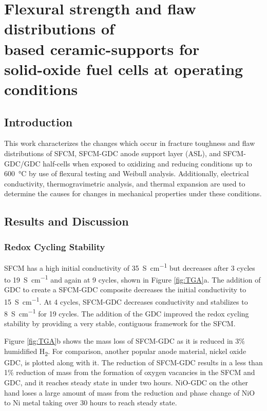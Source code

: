 
\chapter[Flexural strength and flaw distributions of \ce{SrFe_{0.2}Co_{0.4}Mo_{0.4}O_{3}} based ceramic-supports for solid-oxide fuel cells at operating conditions]{Flexural strength and flaw distributions of\\  based ceramic-supports for \\solid-oxide fuel cells at operating conditions}

\section{Introduction}
    This work characterizes the changes which occur in fracture toughness and flaw distributions of SFCM, SFCM-GDC anode support layer (ASL), and SFCM-GDC/GDC half-cells when exposed to oxidizing and reducing conditions up to \SI{600}{\celsius} by use of flexural testing and Weibull analysis.
    Additionally, electrical conductivity, thermogravimetric analysis, and thermal expansion are used to determine the causes for changes in mechanical properties under these conditions.

\section{Results and Discussion}
    \subsection{Redox Cycling Stability}
        SFCM has a high initial conductivity of \SI{35}{S\per\centi\meter} but decreases after 3 cycles to \SI{19}{S\per\centi\meter} and again at 9 cycles, shown in Figure \ref{fig:TGA}a.
        The addition of GDC to create a SFCM-GDC composite decreases the initial conductivity to \SI{15}{S\per\centi\meter}.
        At 4 cycles, SFCM-GDC decreases conductivity and stabilizes to \SI{8}{S\per\centi\meter} for 19 cycles.
        The addition of the GDC improved the redox cycling stability by providing a very stable, contiguous framework for the SFCM.\cite{Mogensen2000,Duncan2006,Bishop2009}

        Figure \ref{fig:TGA}b shows the mass loss of SFCM-GDC as it is reduced in 3\% humidified H\textsubscript{2}.
        For comparison, another popular anode material, nickel oxide GDC, is plotted along with it.
        The reduction of SFCM-GDC results in a less than 1\% reduction of mass from the formation of oxygen vacancies in the SFCM and GDC, and it reaches steady state in under two hours.
        NiO-GDC on the other hand loses a large amount of mass from the reduction and phase change of NiO to Ni metal taking over 30 hours to reach steady state.

